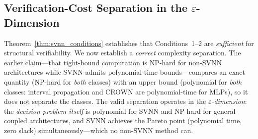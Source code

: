 
\subsection{Verification-Cost Separation in the $\varepsilon$-Dimension}
\label{sec:svnn-necessity}

Theorem~\ref{thm:svnn_conditions} establishes that Conditions~1--2 are
\textit{sufficient} for structural verifiability. We now establish a
\emph{correct} complexity separation. The earlier claim---that tight-bound
computation is NP-hard for non-SVNN architectures while SVNN admits
polynomial-time bounds---compares an exact quantity (NP-hard for \emph{both}
classes) with an upper bound (polynomial for \emph{both} classes: interval
propagation and CROWN are polynomial-time for MLPs), so it does not
separate the classes. The valid separation operates in the
\emph{$\varepsilon$-dimension}: the \emph{decision problem itself} is
polynomial for SVNN and NP-hard for general coupled architectures, and
SVNN achieves the Pareto point (polynomial time, zero slack)
simultaneously---which no non-SVNN method can.

